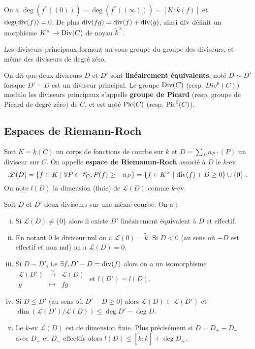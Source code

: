 	\begin{rem}
		On a $\deg(f^*((0))) = \deg(f^*((\infty))) = [K : k(f)]$ et $\deg(\operatorname{div}(f)) = 0$.
		De plus $\operatorname{div}(fg) = \operatorname{div}(f) + \operatorname{div}(g)$, ainsi $\operatorname{div}$ définit un morphisme $K^\times \to \operatorname{Div}(C)$ de noyau $\tilde{k}^\times$.
	\end{rem}
	
	\begin{pop}
		Les diviseurs principaux forment un sous-groupe du groupe des diviseurs, et même des diviseurs de degré zéro.
	\end{pop}
	
	\begin{defn}
		On dit que deux diviseurs $D$ et $D'$ sont \textbf{linéairement équivalents}, noté $D \sim D'$ lorsque $D' - D$ est un diviseur principal.
		Le groupe $\operatorname{Div}(C)$ (resp. $Div^0(C)$) modulo les diviseurs principaux s'appelle \textbf{groupe de Picard} (resp. groupe de Picard de degré zéro) de $C$, et est noté $\operatorname{Pic}(C)$ (resp. $\operatorname{Pic}^0(C)$).
	\end{defn}


\subsection{Espaces de Riemann-Roch}

	\begin{defn}
		Soit $K = k(C)$ un corps de fonctions de courbe sur  $k$ et $D = \sum_P n_P \cdot (P)$ un diviseur sur $C$.
		On appelle \textbf{espace de Riemannn-Roch} associé à $D$ le $k$-ev
		$$\mathscr{L}(D) = \{ f \in K \mid \forall P \in \mathscr{V}_C, P(f) \geq -n_P \}
		                 = \{ f \in K^\times \mid \operatorname{div}(f) + D \geq 0 \} \cup \{ 0 \}\ .$$
		On note $l(D)$ la dimension (finie) de $\mathscr{L}(D)$ comme $k$-ev.
	\end{defn}
	
	\begin{pop}
		Soit $D$ et $D'$ deux diviseurs sur une même courbe.
		On a :
		\begin{enumerate}[(i)]
			\item Si $\mathscr{L}(D) \neq \{ 0 \}$ alors il existe $D'$ linéairement équivalent à $D$ et effectif.
			\item En notant $0$ le diviseur nul on a $\mathscr{L}(0) = \tilde{k}$.
				Si $D < 0$ (au sens où $-D$ est effectif et non nul) on a $\mathscr{L}(D) = 0$.
			\item Si $D \sim D'$, i.e $\exists f, D' - D = \operatorname{div}(f)$ alors on a un isomorphisme $\begin{array}{rcl} \mathscr{L}(D') & \overset{\sim}{\to} & \mathscr{L}(D) \\ g & \mapsto & fg\end{array}$ et $l(D') = l(D)$.
			\item Si $D \leq D'$ (au sens où $D' - D \geq 0$) alors $\mathscr{L}(D) \subset \mathscr{L}(D')$ et $\dim(\mathscr{L}(D') / \mathscr{L}(D)) \leq \deg D' - \deg D$.
			\item Le $k$-ev $\mathscr{L}(D)$ est de dimension finie.
				Plus précisément si $D = D_+ - D_-$ avec $D_+$ et $D_-$ effectifs alors $l(D) \leq [\tilde{k} : k] + \deg D_+$.
		\end{enumerate}
	\end{pop}
	
